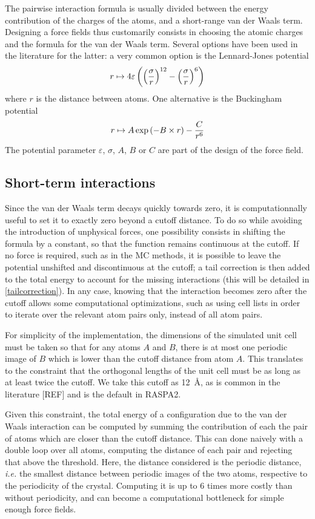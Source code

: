 \documentclass[main.tex]{subfiles}
\begin{document}
The pairwise interaction formula is usually divided between the energy contribution of the charges of the atoms, and a short-range van der Waals term. Designing a force fields thus customarily consists in choosing the atomic charges and the formula for the van der Waals term. Several options have been used in the literature for the latter: a very common option is the Lennard-Jones potential
\[r\mapsto 4\varepsilon\left(\left(\frac \sigma r\right)^{12} - \left(\frac \sigma r\right)^6\right)\label{eq:LJ}\]
where $r$ is the distance between atoms. One alternative is the Buckingham potential
\[r\mapsto A\exp\left(-B\times r\right) - \frac C{r^6}\label{eq:Buckingham}\]
The potential parameter $\varepsilon$, $\sigma$, $A$, $B$ or $C$ are part of the design of the force field.

\subsection{Short-term interactions}

Since the van der Waals term decays quickly towards zero, it is computationnally useful to set it to exactly zero beyond a cutoff distance. To do so while avoiding the introduction of unphysical forces, one possibility consists in shifting the formula by a constant, so that the function remains continuous at the cutoff. If no force is required, such as in the MC methods, it is possible to leave the potential unshifted and discontinuous at the cutoff; a tail correction is then added to the total energy to account for the missing interactions (this will be detailed in \cref{tailcorrection}). In any case, knowing that the interaction becomes zero after the cutoff allows some computational optimizations, such as using cell lists in order to iterate over the relevant atom pairs only, instead of all atom pairs.

For simplicity of the implementation, the dimensions of the simulated unit cell must be taken so that for any atoms $A$ and $B$, there is at most one periodic image of $B$ which is lower than the cutoff distance from atom $A$. This translates to the constraint that the orthogonal lengths of the unit cell must be as long as at least twice the cutoff. We take this cutoff as \qty{12}{\angstrom}, as is common in the literature [REF] and is the default in RASPA2.

Given this constraint, the total energy of a configuration due to the van der Waals interaction can be computed by summing the contribution of each the pair of atoms which are closer than the cutoff distance. This can done naively with a double loop over all atoms, computing the distance of each pair and rejecting that above the threshold. Here, the distance considered is the periodic distance, \textit{i.e.} the smallest distance between periodic images of the two atoms, respective to the periodicity of the crystal. Computing it is up to 6 times more costly than without periodicity, and can become a computational bottleneck for simple enough force fields.
\end{document}
